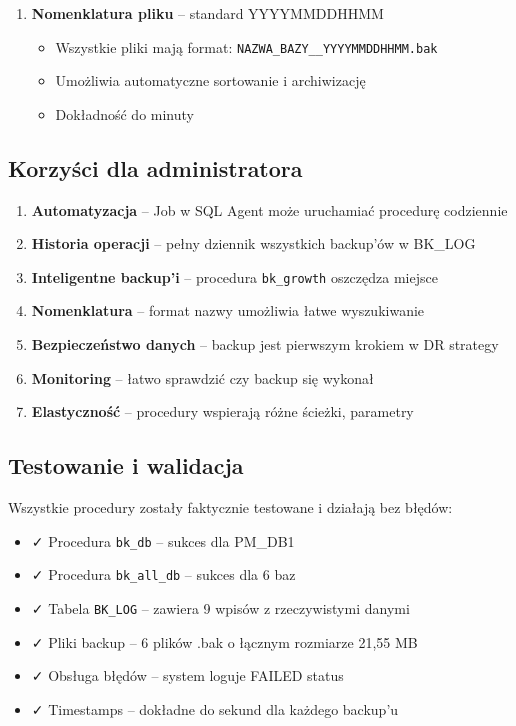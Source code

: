 \documentclass[a4paper,11pt]{article}
\begin{document}
\begin{enumerate}
		\item \textbf{Nomenklatura pliku} -- standard YYYYMMDDHHMM
		\begin{itemize}
			\item Wszystkie pliki mają format: \texttt{NAZWA\_BAZY\_\_YYYYMMDDHHMM.bak}
			\item Umożliwia automatyczne sortowanie i archiwizację
			\item Dokładność do minuty
		\end{itemize}
	\end{enumerate}
	
	\subsection{Korzyści dla administratora}
	
	\begin{enumerate}
		\item \textbf{Automatyzacja} -- Job w SQL Agent może uruchamiać procedurę codziennie
		\item \textbf{Historia operacji} -- pełny dziennik wszystkich backup'ów w BK\_LOG
		\item \textbf{Inteligentne backup'i} -- procedura \texttt{bk\_growth} oszczędza miejsce
		\item \textbf{Nomenklatura} -- format nazwy umożliwia łatwe wyszukiwanie
		\item \textbf{Bezpieczeństwo danych} -- backup jest pierwszym krokiem w DR strategy
		\item \textbf{Monitoring} -- łatwo sprawdzić czy backup się wykonał
		\item \textbf{Elastyczność} -- procedury wspierają różne ścieżki, parametry
	\end{enumerate}
	
	\subsection{Testowanie i walidacja}
	
	Wszystkie procedury zostały faktycznie testowane i działają bez błędów:
	
	\begin{itemize}
		\item ✓ Procedura \texttt{bk\_db} -- sukces dla PM\_DB1
		\item ✓ Procedura \texttt{bk\_all\_db} -- sukces dla 6 baz
		\item ✓ Tabela \texttt{BK\_LOG} -- zawiera 9 wpisów z rzeczywistymi danymi
		\item ✓ Pliki backup -- 6 plików .bak o łącznym rozmiarze 21,55 MB
		\item ✓ Obsługa błędów -- system loguje FAILED status
		\item ✓ Timestamps -- dokładne do sekund dla każdego backup'u
	\end{itemize}
	
\end{document}

